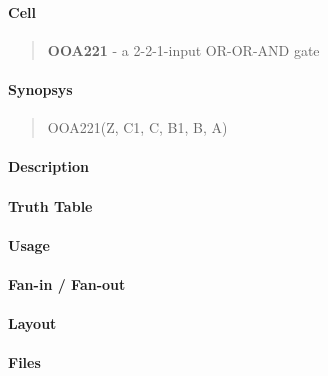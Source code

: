 \label{OOA221}
\paragraph{Cell}
\begin{quote}
    \textbf{OOA221} - a 2-2-1-input OR-OR-AND gate
\end{quote}

\paragraph{Synopsys}
\begin{quote}
    OOA221(Z, C1, C, B1, B, A)
\end{quote}

\paragraph{Description}

%

\paragraph{Truth Table}
%

\paragraph{Usage}

\paragraph{Fan-in / Fan-out}

\paragraph{Layout}

\paragraph{Files}
